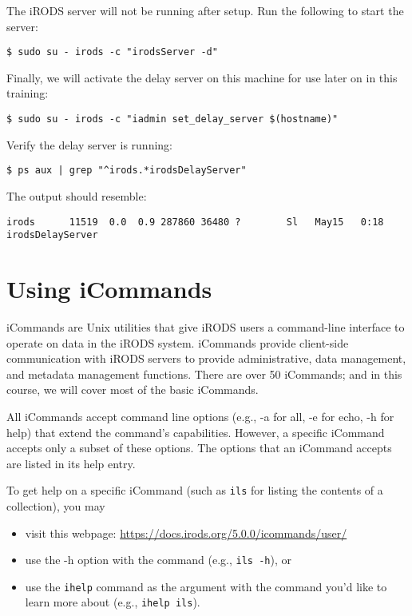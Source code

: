 \documentclass[10pt,oneside]{memoir}
\begin{document}
The iRODS server will not be running after setup. Run the following to start the server:
\begin{lstlisting}
$ sudo su - irods -c "irodsServer -d"
\end{lstlisting}

Finally, we will activate the delay server on this machine for use later on in this training:
\begin{lstlisting}
$ sudo su - irods -c "iadmin set_delay_server $(hostname)"
\end{lstlisting}

Verify the delay server is running:
\begin{lstlisting}
$ ps aux | grep "^irods.*irodsDelayServer"
\end{lstlisting}

The output should resemble:
\begin{lstlisting}
irods      11519  0.0  0.9 287860 36480 ?        Sl   May15   0:18 irodsDelayServer
\end{lstlisting}

\chapter{Using iCommands}

iCommands are Unix utilities that give iRODS users a command-line interface to operate on data in the iRODS system. iCommands provide client-side communication with iRODS servers to provide administrative, data management, and metadata management functions. There are over 50 iCommands; and in this course, we will cover most of the basic iCommands.

All iCommands accept command line options (e.g., -a for all, -e for echo, -h for help) that extend the command's capabilities. However, a specific iCommand accepts only a subset of these options. The options that an iCommand accepts are listed in its help entry.

To get help on a specific iCommand (such as \texttt{ils} for listing the contents of a collection), you may
\begin{itemize}
 \item visit this webpage: \url{https://docs.irods.org/5.0.0/icommands/user/}
 \item use the -h option with the command (e.g., \texttt{ils -h}), or
 \item use the \texttt{ihelp} command as the argument with the command you'd like to learn more
         about (e.g., \texttt{ihelp ils}).
\end{itemize}
\end{document}
